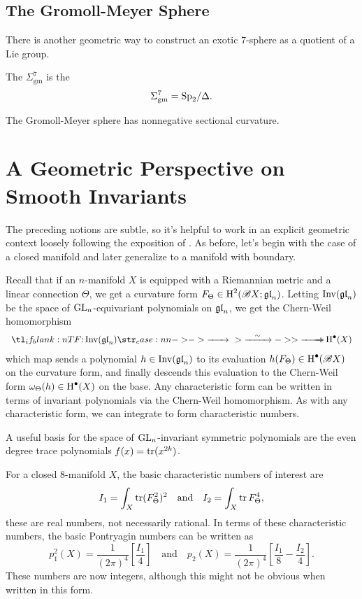 \subsection*{The Gromoll-Meyer Sphere}

There is another geometric way to construct an exotic $7$-sphere as a quotient of a Lie group.

\begin{definition}
	The  $\Sigma_{\mathrm{gm}}^7$ is the
	\[
		\Sigma_{\mathrm{gm}}^7 = {\operatorname{Sp}}_2/\Delta.
	\]
\end{definition}

\begin{theorem}
	The Gromoll-Meyer sphere has nonnegative sectional curvature.
\end{theorem}

\section{A Geometric Perspective on Smooth Invariants}

The preceding notions are subtle, so it's helpful to work in an explicit geometric context loosely following the exposition of \cite{witten1985global}. As before, let's begin with the case of a closed manifold and later generalize to a manifold with boundary.

Recall that if an $n$-manifold $X$ is equipped with a Riemannian metric and a linear connection $\Theta$, we get a curvature form $F_\Theta\in \operatorname{H}^2(\mathscr{B} X; \mathfrak{gl}_n)$. Letting $\operatorname{\operatorname{Inv}}(\mathfrak{gl}_n)$ be the space of ${\operatorname{GL}}_n$-equivariant polynomials on $\mathfrak{gl}_n$, we get the Chern-Weil homomorphism
\[
	\lkxfunc{}{\Inv(\gl_n)}{\H^\bullet(X)}
\]
which map sends a polynomial $h\in \operatorname{\operatorname{Inv}}(\mathfrak{gl}_n)$ to its evaluation $h(F_\Theta)\in \operatorname{H}^\bullet(\mathscr{B} X)$ on the curvature form, and finally descends this evaluation to the Chern-Weil form $\omega_\Theta(h) \in \operatorname{H}^\bullet(X)$ on the base. Any characteristic form can be written in terms of invariant polynomials via the Chern-Weil homomorphism. As with any characteristic form, we can integrate to form characteristic numbers.

\begin{note*}
	A useful basis for the space of ${\operatorname{GL}}_n$-invariant symmetric polynomials are the even degree trace polynomials $f(x)=\operatorname{\operatorname{tr}}(x^{2k})$.
\end{note*}

\begin{example}\label{exam:chern-weil_8-manifold}
	For a closed $8$-manifold $X$, the basic characteristic numbers of interest are
	\[
		I_1 = \int_X \operatorname{\operatorname{tr}} (F_\Theta^2)^2
		\quad\textrm{and}\quad
		I_2 = \int_X \operatorname{\operatorname{tr}} F_\Theta^4,
	\]
	these are real numbers, not necessarily rational. In terms of these characteristic numbers, the basic Pontryagin numbers can be written as
	\[
		p_1^2(X) = \frac{1}{(2\pi)^4} \left[\frac{I_1}{4}\right]
		\quad\textrm{and}\quad
		p_2(X) = \frac{1}{(2\pi)^4}\left[\frac{I_1}{8} - \frac{I_2}{4}\right].
	\]
	These numbers are now integers, although this might not be obvious when written in this form.
\end{example}

